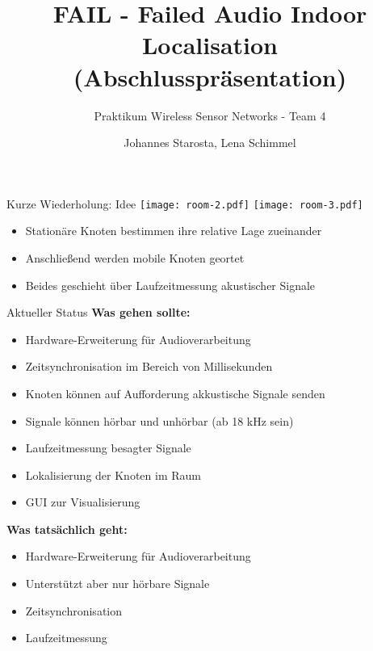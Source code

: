 \documentclass[fleqn,11pt]{beamer}
\title{FAIL - Failed Audio Indoor  Localisation\\
(Abschlusspräsentation)}
\subtitle{Praktikum Wireless Sensor Networks - Team 4}
\author{Johannes Starosta, Lena Schimmel}
\begin{document}
\begin{frame}[plain]
\titlepage
\end{frame}

\begin{frame}{Kurze Wiederholung: Idee}
	\texttt{[image: room-2.pdf]}
	\texttt{[image: room-3.pdf]}
	\begin{itemize}
		\item Stationäre Knoten bestimmen ihre relative Lage zueinander
		\item Anschließend werden mobile Knoten geortet
		\item Beides geschieht über Laufzeitmessung akustischer Signale
	\end{itemize}
\end{frame}

\begin{frame}{Aktueller Status}
  \textbf{Was gehen sollte:}
	\begin{itemize}
	  \item    Hardware-Erweiterung für Audioverarbeitung
	  \item  Zeitsynchronisation im Bereich von Millisekunden
	  \item   Knoten können auf Aufforderung akkustische Signale senden
	  \item   Signale können hörbar und unhörbar (ab 18 kHz sein)
	  \item   Laufzeitmessung besagter Signale
	  \item   Lokalisierung der Knoten im Raum
	  \item   GUI zur Visualisierung

	\end{itemize}
	
	\textbf{Was tatsächlich geht:}
	\begin{itemize}
	  \item Hardware-Erweiterung für Audioverarbeitung
	  \item   Unterstützt aber nur hörbare Signale
	  \item  Zeitsynchronisation
	  \item   Laufzeitmessung
	\end{itemize}
\end{frame}
\end{document}
